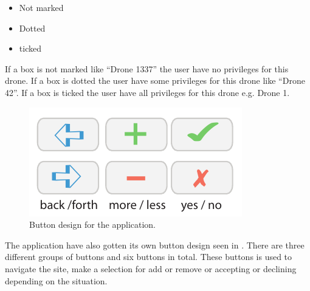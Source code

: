 \begin{itemize}
	\item Not marked
	\item Dotted
	\item ticked
\end{itemize}
 
If a box is not marked like ``Drone 1337'' the user have no privileges for this drone. If a box is dotted the user have some privileges for this drone like ``Drone 42''. If a box is ticked the user have all privileges for this drone e.g. Drone 1.

\begin{figure}[htb]
    \centering
    \includegraphics[scale=1.0]{gfx/button.pdf}
    \caption{Button design for the application.}
    \label{fig:button_design}
\end{figure}

The \projectname{} application have also gotten its own button design seen in . There are three different groups of buttons and six buttons in total.
These buttons is used to navigate the site, make a selection for add or remove or accepting or declining depending on the situation.